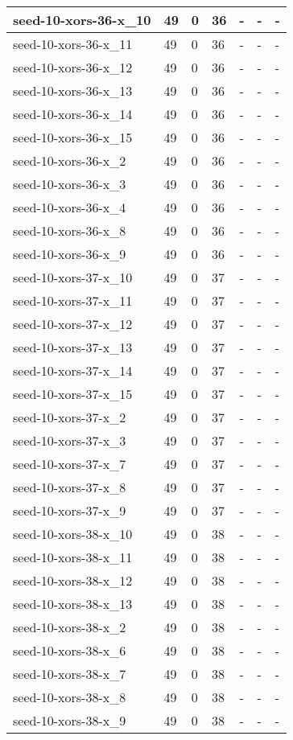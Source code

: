 \begin{scriptsize}
\begin{longtable}{|p{5cm}|l|l|l|l|l|l|}
seed-10-xors-36-x\_10&49&0&36&-&-&- \\ \hline 
seed-10-xors-36-x\_11&49&0&36&-&-&- \\ \hline 
seed-10-xors-36-x\_12&49&0&36&-&-&- \\ \hline 
seed-10-xors-36-x\_13&49&0&36&-&-&- \\ \hline 
seed-10-xors-36-x\_14&49&0&36&-&-&- \\ \hline 
seed-10-xors-36-x\_15&49&0&36&-&-&- \\ \hline 
seed-10-xors-36-x\_2&49&0&36&-&-&- \\ \hline 
seed-10-xors-36-x\_3&49&0&36&-&-&- \\ \hline 
seed-10-xors-36-x\_4&49&0&36&-&-&- \\ \hline 
seed-10-xors-36-x\_8&49&0&36&-&-&- \\ \hline 
seed-10-xors-36-x\_9&49&0&36&-&-&- \\ \hline 
seed-10-xors-37-x\_10&49&0&37&-&-&- \\ \hline 
seed-10-xors-37-x\_11&49&0&37&-&-&- \\ \hline 
seed-10-xors-37-x\_12&49&0&37&-&-&- \\ \hline 
seed-10-xors-37-x\_13&49&0&37&-&-&- \\ \hline 
seed-10-xors-37-x\_14&49&0&37&-&-&- \\ \hline 
seed-10-xors-37-x\_15&49&0&37&-&-&- \\ \hline 
seed-10-xors-37-x\_2&49&0&37&-&-&- \\ \hline 
seed-10-xors-37-x\_3&49&0&37&-&-&- \\ \hline 
seed-10-xors-37-x\_7&49&0&37&-&-&- \\ \hline 
seed-10-xors-37-x\_8&49&0&37&-&-&- \\ \hline 
seed-10-xors-37-x\_9&49&0&37&-&-&- \\ \hline 
seed-10-xors-38-x\_10&49&0&38&-&-&- \\ \hline 
seed-10-xors-38-x\_11&49&0&38&-&-&- \\ \hline 
seed-10-xors-38-x\_12&49&0&38&-&-&- \\ \hline 
seed-10-xors-38-x\_13&49&0&38&-&-&- \\ \hline 
seed-10-xors-38-x\_2&49&0&38&-&-&- \\ \hline 
seed-10-xors-38-x\_6&49&0&38&-&-&- \\ \hline 
seed-10-xors-38-x\_7&49&0&38&-&-&- \\ \hline 
seed-10-xors-38-x\_8&49&0&38&-&-&- \\ \hline 
seed-10-xors-38-x\_9&49&0&38&-&-&- \\ \hline 

\end{longtable}
\end{scriptsize}

